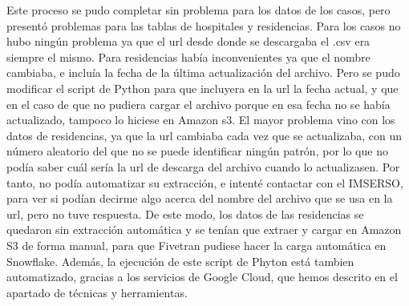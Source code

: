 Este proceso se pudo completar sin problema para los datos de los casos, pero presentó problemas para las tablas de hospitales y residencias. Para los casos no hubo ningún problema ya que el url desde donde se descargaba el .csv era siempre el mismo. Para residencias había inconvenientes ya que el nombre cambiaba, e incluía la fecha de la última actualización del archivo. Pero se pudo modificar el script de Python para que incluyera en la url la fecha actual, y que en el caso de que no pudiera cargar el archivo porque en esa fecha no se había actualizado, tampoco lo hiciese en Amazon s3. El mayor problema vino con los datos de residencias, ya que la url cambiaba cada vez que se actualizaba, con un número aleatorio del que no se puede identificar ningún patrón, por lo que no podía saber cuál sería la url de descarga del archivo cuando lo actualizasen. Por tanto, no podía automatizar su extracción, e intenté contactar con el IMSERSO, para ver si podían decirme algo acerca del nombre del archivo que se usa en la url, pero no tuve respuesta. De este modo,  los datos de las residencias se quedaron sin extracción automática y se tenían que extraer y cargar en Amazon S3 de forma manual, para que Fivetran pudiese hacer la carga automática en Snowflake. Además, la ejecución de este script de Phyton está tambien automatizado, gracias a los servicios de Google Cloud, que hemos descrito en el apartado de técnicas y herramientas.